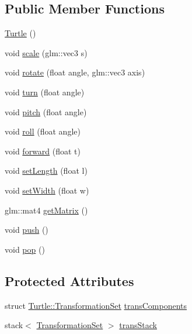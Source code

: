 \subsection*{Public Member Functions}
\begin{DoxyCompactItemize}
\item 
\hyperlink{class_turtle_a1610c37c2e750169f25b074e62db755d}{Turtle} ()
\item 
void \hyperlink{class_turtle_a52f47f3d3f660de0f425eb15f51f57a9}{scale} (glm\+::vec3 s)
\item 
void \hyperlink{class_turtle_a6365b6bf9e1b63ad7067623704f96b7b}{rotate} (float angle, glm\+::vec3 axis)
\item 
void \hyperlink{class_turtle_a7247837e1e7f34053ceba1a8ba35f792}{turn} (float angle)
\item 
void \hyperlink{class_turtle_af612347a6ccf6020a86e14b0bad76d29}{pitch} (float angle)
\item 
void \hyperlink{class_turtle_a12f15e7d93be8f46c4af5b2815cad994}{roll} (float angle)
\item 
void \hyperlink{class_turtle_ad02ab2d43a59a84c79ecee57dbe7d1dc}{forward} (float t)
\item 
void \hyperlink{class_turtle_a83d7165e83a6a4c82e54f4e918163eab}{set\+Length} (float l)
\item 
void \hyperlink{class_turtle_ab106e2a57335119d0f307d19633f682b}{set\+Width} (float w)
\item 
glm\+::mat4 \hyperlink{class_turtle_a29c13ff42b394345c21dad4c84022bcc}{get\+Matrix} ()
\item 
void \hyperlink{class_turtle_a9562a857f3d87a742a28f2b3bca4995c}{push} ()
\item 
void \hyperlink{class_turtle_a1967bcd0701b9fbab2d312194a575703}{pop} ()
\end{DoxyCompactItemize}
\subsection*{Protected Attributes}
\begin{DoxyCompactItemize}
\item 
struct \hyperlink{struct_turtle_1_1_transformation_set}{Turtle\+::\+Transformation\+Set} \hyperlink{class_turtle_a1c9daa775c36e1a3414522488780f686}{trans\+Components}
\item 
stack$<$ \hyperlink{struct_turtle_1_1_transformation_set}{Transformation\+Set} $>$ \hyperlink{class_turtle_ab881dbccdf3460b344ff3bd724d1cf06}{trans\+Stack}
\end{DoxyCompactItemize}


